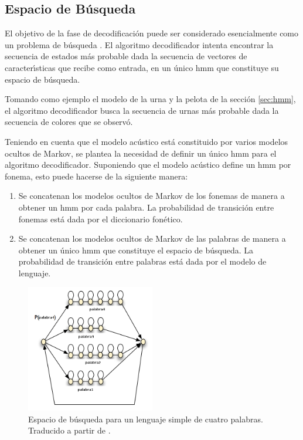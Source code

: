 \subsection{Espacio de B\'usqueda}
El objetivo de la fase de decodificaci\'on puede ser considerado esencialmente como un problema de 
b\'usqueda \cite{huang-handbook10}.
El algoritmo decodificador intenta encontrar la secuencia de estados m\'as probable dada la secuencia de
vectores de caracter{\'\i}sticas que recibe como entrada, en un \'unico \gls{hmm} que constituye su 
espacio de b\'usqueda.

Tomando como ejemplo el modelo de la urna y la pelota de la secci\'on \ref{sec:hmm}, el algoritmo decodificador
busca la secuencia de urnas m\'as probable dada la secuencia de colores que se observ\'o.

Teniendo en cuenta que el modelo ac\'ustico est\'a constituido por varios modelos ocultos de Markov, se plantea
la necesidad de definir un \'unico \gls{hmm} para el algoritmo decodificador. Suponiendo que el modelo ac\'ustico
define un \gls{hmm} por fonema, esto puede hacerse de la siguiente manera:

\begin{enumerate}
	\item Se concatenan los modelos ocultos de Markov de los fonemas de manera a obtener un \gls{hmm} 
	por cada palabra. 
	La probabilidad de transici\'on entre fonemas est\'a dada por el diccionario fon\'etico.
	\item Se concatenan los modelos ocultos de Markov de las palabras de manera a obtener un \'unico \gls{hmm} que
	constituye el espacio de b\'usqueda. La probabilidad de transici\'on entre palabras est\'a dada por el modelo
	de lenguaje.
\end{enumerate}

\begin{figure}[H] 
\centering
\includegraphics[width=0.5\textwidth]{./graphics/espacio.png}
\caption{Espacio de b\'usqueda para un lenguaje simple de cuatro palabras. Traducido a partir de \cite{RenalsSearch}.}
\label{figure:espacio-busqueda}
\end{figure}



